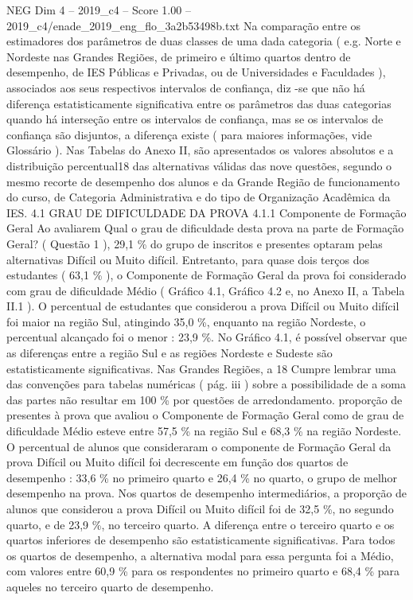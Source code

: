 \begin{textsample}{NEG Dim 4 – 2019\_c4 – Score 1.00 – 2019\_c4/enade\_2019\_eng\_flo\_3a2b53498b.txt}
Na comparação entre os estimadores dos parâmetros de duas classes de uma dada categoria ( e.g.
Norte e Nordeste nas Grandes Regiões, de primeiro e último quartos dentro de desempenho, de IES Públicas e Privadas, ou de Universidades e Faculdades ), associados aos seus respectivos intervalos de confiança, diz -se que não há diferença estatisticamente significativa entre os parâmetros das duas categorias quando há interseção entre os intervalos de confiança, mas se os intervalos de confiança são disjuntos, a diferença existe ( para maiores informações, vide Glossário ).
Nas Tabelas do Anexo II, são apresentados os valores absolutos e a distribuição percentual18 das alternativas válidas das nove questões, segundo o mesmo recorte de desempenho dos alunos e da Grande Região de funcionamento do curso, de Categoria Administrativa e do tipo de Organização Acadêmica da IES. 4.1 GRAU DE DIFICULDADE DA PROVA 4.1.1 Componente de Formação Geral Ao avaliarem Qual o grau de dificuldade desta prova na parte de Formação Geral? ( Questão 1 ), 29,1 \% do grupo de inscritos e presentes optaram pelas alternativas Difícil ou Muito difícil.
Entretanto, para quase dois terços dos estudantes ( 63,1 \% ), o Componente de Formação Geral da prova foi considerado com grau de dificuldade Médio ( Gráfico 4.1, Gráfico 4.2 e, no Anexo II, a Tabela II.1 ).
O percentual de estudantes que considerou a prova Difícil ou Muito difícil foi maior na região Sul, atingindo 35,0 \%, enquanto na região Nordeste, o percentual alcançado foi o menor : 23,9 \%.
No Gráfico 4.1, é possível observar que as diferenças entre a região Sul e as regiões Nordeste e Sudeste são estatisticamente significativas.
Nas Grandes Regiões, a 18 Cumpre lembrar uma das convenções para tabelas numéricas ( pág. iii ) sobre a possibilidade de a soma das partes não resultar em 100 \% por questões de arredondamento. proporção de presentes à prova que avaliou o Componente de Formação Geral como de grau de dificuldade Médio esteve entre 57,5 \% na região Sul e 68,3 \% na região Nordeste.
O percentual de alunos que consideraram o componente de Formação Geral da prova Difícil ou Muito difícil foi decrescente em função dos quartos de desempenho : 33,6 \% no primeiro quarto e 26,4 \% no quarto, o grupo de melhor desempenho na prova.
Nos quartos de desempenho intermediários, a proporção de alunos que considerou a prova Difícil ou Muito difícil foi de 32,5 \%, no segundo quarto, e de 23,9 \%, no terceiro quarto.
A diferença entre o terceiro quarto e os quartos inferiores de desempenho são estatisticamente significativas.
Para todos os quartos de desempenho, a alternativa modal para essa pergunta foi a Médio, com valores entre 60,9 \% para os respondentes no primeiro quarto e 68,4 \% para aqueles no terceiro quarto de desempenho.

\end{textsample}
